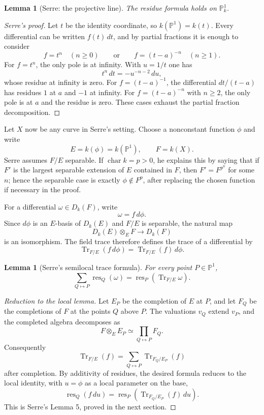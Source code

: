 \documentclass[11pt,a4paper]{article}
\newcommand{\res}{\operatorname{res}}
\newcommand{\Tr}{\operatorname{Tr}}
\theoremstyle{definition}
\theoremstyle{plain}
\newtheorem{lemma}[definition]{Lemma}
\theoremstyle{remark}
\begin{document}
\begin{lemma}[Serre: the projective line]
The residue formula holds on $\mathbb P^1_k$.
\end{lemma}

\begin{proof}[Serre's proof]
Let $t$ be the identity coordinate, so $k(\mathbb P^1)=k(t)$.  Every differential can be written $f(t)\,dt$, and by partial fractions it is enough to consider
\[
  f=t^n\quad(n\ge0)
  \qquad\text{or}\qquad
  f=(t-a)^{-n}\quad(n\ge1).
\]
For $f=t^n$, the only pole is at infinity.  With $u=1/t$ one has
\[
  t^n\,dt=-u^{-n-2}\,du,
\]
whose residue at infinity is zero.  For $f=(t-a)^{-1}$, the differential $dt/(t-a)$ has residues $1$ at $a$ and $-1$ at infinity.  For $f=(t-a)^{-n}$ with $n\ge2$, the only pole is at $a$ and the residue is zero.  These cases exhaust the partial fraction decomposition.
\end{proof}

Let $X$ now be any curve in Serre's setting.  Choose a nonconstant function $\phi$ and write
\[
  E=k(\phi)=k(\mathbb P^1),
  \qquad
  F=k(X).
\]
Serre assumes $F/E$ separable.  If $\operatorname{char}k=p>0$, he explains this by saying that if $F'$ is the largest separable extension of $E$ contained in $F$, then $F'=F^{p^n}$ for some $n$; hence the separable case is exactly $\phi\notin F^p$, after replacing the chosen function if necessary in the proof.

For a differential $\omega\in D_k(F)$, write
\[
  \omega=f\,d\phi.
\]
Since $d\phi$ is an $E$-basis of $D_k(E)$ and $F/E$ is separable, the natural map
\[
  D_k(E)\otimes_E F\longrightarrow D_k(F)
\]
is an isomorphism.  The field trace therefore defines the trace of a differential by
\[
  \Tr_{F/E}(f\,d\phi)=\Tr_{F/E}(f)\,d\phi.
\]

\begin{lemma}[Serre's semilocal trace formula]
For every point $P\in\mathbb P^1$,
\[
  \sum_{Q\mapsto P}\res_Q(\omega)
  =\res_P(\Tr_{F/E}\omega).
\]
\end{lemma}

\begin{proof}[Reduction to the local lemma]
Let $E_P$ be the completion of $E$ at $P$, and let $F_Q$ be the completions of $F$ at the points $Q$ above $P$.  The valuations $v_Q$ extend $v_P$, and the completed algebra decomposes as
\[
  F\otimes_E E_P\simeq \prod_{Q\mapsto P}F_Q.
\]
Consequently
\[
  \Tr_{F/E}(f)=\sum_{Q\mapsto P}\Tr_{F_Q/E_P}(f)
\]
after completion.  By additivity of residues, the desired formula reduces to the local identity, with $u=\phi$ as a local parameter on the base,
\[
  \res_Q(f\,du)=\res_P(\Tr_{F_Q/E_P}(f)\,du).
\]
This is Serre's Lemma 5, proved in the next section.
\end{proof}
\end{document}

